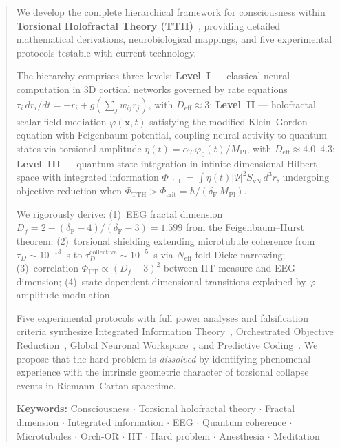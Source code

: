 \documentclass[12pt,a4paper]{article}
\newcommand{\MPl}{M_{\mathrm{Pl}}}
\newcommand{\phicrit}{\Phi_{\mathrm{crit}}}
\newcommand{\phiTTH}{\Phi_{\mathrm{TTH}}}
\newcommand{\phiIIT}{\Phi_{\mathrm{IIT}}}
\newcommand{\SvN}{S_{\mathrm{vN}}}
\newcommand{\etacoupl}{\eta(t)}
\newcommand{\alphaT}{\alpha_T}
\newcommand{\Feig}{\delta_{\mathrm{F}}}
\numberwithin{equation}{section}
\begin{document}
\begin{abstract}
\noindent
We develop the complete hierarchical framework for consciousness within
\textbf{Torsional Holofractal Theory (TTH)}~\citep{Calmels2026a},
providing detailed mathematical derivations, neurobiological mappings,
and five experimental protocols testable with current technology.

The hierarchy comprises three levels:
\textbf{Level~I} --- classical neural computation in 3D cortical networks
governed by rate equations $\tau_i\,dr_i/dt = -r_i + g(\sum_j w_{ij}r_j)$,
with $D_{\mathrm{eff}} \approx 3$;
\textbf{Level~II} --- holofractal scalar field mediation $\varphi(\mathbf{x},t)$
satisfying the modified Klein--Gordon equation with Feigenbaum potential,
coupling neural activity to quantum states via torsional amplitude
$\etacoupl = \alphaT\,\varphi_0(t)/\MPl$, with $D_{\mathrm{eff}} \approx 4.0$--$4.3$;
\textbf{Level~III} --- quantum state integration in infinite-dimensional Hilbert space
with integrated information $\phiTTH = \int\etacoupl|\Psi|^2\SvN\,d^3r$,
undergoing objective reduction when $\phiTTH > \phicrit = \hbar/(\Feig\,\MPl)$.

We rigorously derive:
(1)~EEG fractal dimension $D_f = 2-(\Feig-4)/(\Feig-3) = 1.599$ from the
Feigenbaum--Hurst theorem;
(2)~torsional shielding extending microtubule coherence from
$\tau_D \sim 10^{-13}$~s to $\tau_D^{\mathrm{collective}} \sim 10^{-5}$~s
via $N_{\mathrm{eff}}$-fold Dicke narrowing;
(3)~correlation $\phiIIT \propto (D_f-3)^2$ between IIT measure and EEG dimension;
(4)~state-dependent dimensional transitions explained by $\varphi$ amplitude modulation.

Five experimental protocols with full power analyses and falsification criteria
synthesize Integrated Information Theory~\citep{Tononi2016},
Orchestrated Objective Reduction~\citep{Hameroff2014},
Global Neuronal Workspace~\citep{Dehaene2011}, and
Predictive Coding~\citep{Friston2010}.
We propose that the hard problem is \emph{dissolved} by identifying
phenomenal experience with the intrinsic geometric character of
torsional collapse events in Riemann--Cartan spacetime.

\medskip
\noindent\textbf{Keywords:}
Consciousness $\cdot$ Torsional holofractal theory $\cdot$ Fractal dimension $\cdot$
Integrated information $\cdot$ EEG $\cdot$ Quantum coherence $\cdot$ Microtubules $\cdot$
Orch-OR $\cdot$ IIT $\cdot$ Hard problem $\cdot$ Anesthesia $\cdot$ Meditation
\end{abstract}
\end{document}
